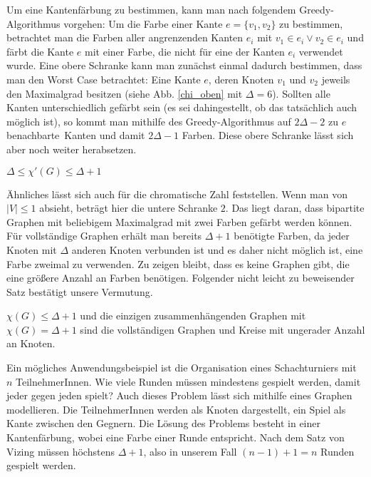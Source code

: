 Um eine Kantenfärbung zu bestimmen, kann man nach folgendem Greedy-Algorithmus vorgehen: Um die Farbe einer Kante $e=\{v_1,v_2\}$ zu bestimmen, betrachtet man die Farben aller angrenzenden Kanten $e_i$ mit $v_1\in e_i\lor v_2\in e_i$ und färbt die Kante $e$ mit einer Farbe, die nicht für eine der Kanten $e_i$ verwendet wurde.
Eine obere Schranke kann man zunächst einmal dadurch bestimmen, dass man den Worst Case
betrachtet: Eine Kante $e$, deren Knoten $v_1$ und $v_2$ jeweils den Maximalgrad besitzen (siehe Abb. \ref{chi_oben} mit $\Delta=6$). Sollten alle Kanten unterschiedlich gefärbt sein  (es sei dahingestellt, ob das tatsächlich auch möglich ist), so kommt man mithilfe des Greedy-Algorithmus auf $2\Delta-2$ zu $e$ \glqq benachbarte\grqq\  Kanten und damit $2\Delta-1$ Farben.
Diese obere Schranke lässt sich aber noch weiter herabsetzen.
\begin{satz}[Vizing]
 $\Delta\leq\chi'(G)\leq\Delta+1$
\end{satz}
Ähnliches lässt sich auch für die chromatische Zahl feststellen. Wenn man von $|V|\leq1$ absieht, beträgt hier die untere Schranke $2$.
Das liegt daran, dass bipartite Graphen mit beliebigem Maximalgrad mit zwei Farben gefärbt werden können. Für vollständige Graphen erhält man bereits $\Delta+1$ benötigte Farben, da jeder Knoten mit $\Delta$ anderen Knoten verbunden ist und es daher nicht möglich ist, eine Farbe zweimal zu verwenden. Zu zeigen  bleibt, dass es keine Graphen gibt, die eine größere Anzahl an Farben benötigen.
 Folgender nicht leicht zu beweisender Satz bestätigt unsere Vermutung.
\begin{satz}[Brooks]
 $\chi(G)\leq\Delta+1$ und die einzigen zusammenhängenden Graphen mit $\chi(G)=\Delta+1$ sind die vollständigen Graphen und Kreise mit ungerader Anzahl an Knoten. 
\end{satz}
Ein mögliches Anwendungsbeispiel ist die Organisation eines Schachturniers mit $n$ TeilnehmerInnen. Wie viele Runden müssen mindestens gespielt werden, damit jeder gegen jeden spielt? Auch dieses Problem lässt sich mithilfe eines Graphen modellieren. Die TeilnehmerInnen werden als Knoten dargestellt, ein Spiel als Kante zwischen den Gegnern. Die Lösung des Problems besteht in einer Kantenfärbung, wobei eine Farbe einer Runde entspricht. Nach dem Satz von Vizing müssen höchstens $\Delta+1$, also in unserem Fall $(n-1)+1=n$ Runden gespielt werden.